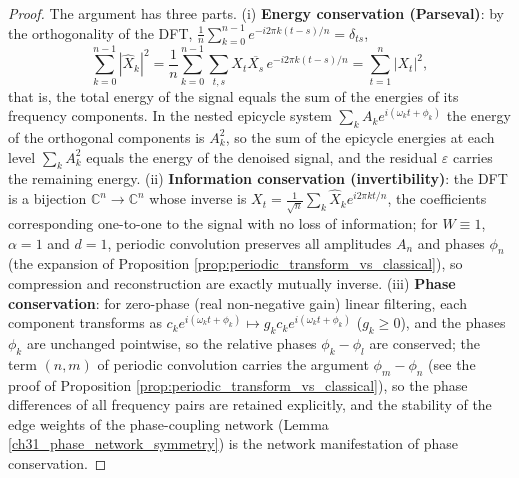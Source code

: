 \begin{proof}
The argument has three parts.
(i) \textbf{Energy conservation (Parseval)}: by the orthogonality of the DFT, $\frac{1}{n}\sum_{k=0}^{n-1} e^{-i 2\pi k(t-s)/n} = \delta_{ts}$,
\[
\sum_{k=0}^{n-1} |\hat{X}_k|^2 = \frac{1}{n}\sum_{k=0}^{n-1}\sum_{t,s} X_t \overline{X_s}\, e^{-i 2\pi k(t-s)/n} = \sum_{t=1}^{n} |X_t|^2,
\]
that is, the total energy of the signal equals the sum of the energies of its frequency components. In the nested epicycle system $\sum_k A_k e^{i(\omega_k t + \phi_k)}$ the energy of the orthogonal components is $A_k^2$, so the sum of the epicycle energies at each level $\sum_k A_k^2$ equals the energy of the denoised signal, and the residual $\varepsilon$ carries the remaining energy. (ii) \textbf{Information conservation (invertibility)}: the DFT is a bijection $\mathbb{C}^n \to \mathbb{C}^n$ whose inverse is $X_t = \frac{1}{\sqrt{n}}\sum_k \hat{X}_k e^{i 2\pi kt/n}$, the coefficients corresponding one-to-one to the signal with no loss of information; for $W \equiv 1$, $\alpha = 1$ and $d = 1$, periodic convolution preserves all amplitudes $A_n$ and phases $\phi_n$ (the expansion of Proposition \ref{prop:periodic_transform_vs_classical}), so compression and reconstruction are exactly mutually inverse. (iii) \textbf{Phase conservation}: for zero-phase (real non-negative gain) linear filtering, each component transforms as $c_k e^{i(\omega_k t + \phi_k)} \mapsto g_k c_k e^{i(\omega_k t + \phi_k)}$ ($g_k \ge 0$), and the phases $\phi_k$ are unchanged pointwise, so the relative phases $\phi_k - \phi_l$ are conserved; the term $(n,m)$ of periodic convolution carries the argument $\phi_m - \phi_n$ (see the proof of Proposition \ref{prop:periodic_transform_vs_classical}), so the phase differences of all frequency pairs are retained explicitly, and the stability of the edge weights of the phase-coupling network (Lemma \ref{ch31_phase_network_symmetry}) is the network manifestation of phase conservation.
\end{proof}

